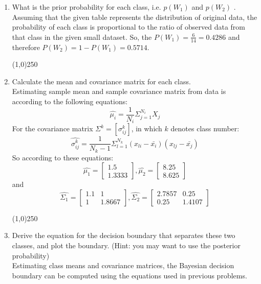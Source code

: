 \documentclass[12pt]{article}
\newcommand{\svector}[2]{\left[ \begin{matrix} #1 \\ #2 \end{matrix}\right]}
\newcommand{\smatrix}[4]{\left[ \begin{matrix} #1 & #2 \\ #3 & #4 \end{matrix}\right]}
\begin{document}
\begin{enumerate}
\item What is the prior probability for each class, i.e. $p(W_1)$ and $p(W_2 )$ . \\

Assuming that the given table represents the distribution of original data, the probability of each class is proportional to the ratio of observed data from that class in the given small dataset. So, the $P(W_1) = \frac{6}{14} = 0.4286$ and therefore $P(W_2) = 1 - P(W_1) = 0.5714$.


\begin{center}
\line(1,0){250}
\end{center}

\item Calculate the mean and covariance matrix for each class. \\
Estimating sample mean and sample covariance matrix from data is according to the following equations:
\begin{equation}
\hat{\mu_i} = \frac{1}{N_i} \Sigma_{j=1}^{N_i} X_j
\end{equation}
For the covariance matrix $\Sigma^k = [\sigma_{ij}^k]$, in which $k$ denotes class number:
\begin{equation}
\hat{\sigma_{ij}^k} = \frac{1}{N_k - 1} \Sigma_{l=1}^{N_k} (x_{li} - \bar{x_i})(x_{lj} - \bar{x_j})
\end{equation}
So according to these equations:
\begin{equation}
\hat{\mu_1} = \svector{1.5}{1.3333}, \hat{\mu_2} = \svector{8.25}{8.625}
\end{equation}
and
\begin{equation}
\hat{\Sigma_1} = \smatrix{1.1}{1}{1}{1.8667}, \hat{\Sigma_2} = \smatrix{2.7857}{0.25}{0.25}{1.4107}
\end{equation}





\begin{center}
\line(1,0){250}
\end{center}

\item Derive the equation for the decision boundary that separates these two classes, and plot the boundary. (Hint: you may want to use the posterior probability)\\
Estimating class means and covariance matrices, the Bayesian decision boundary can be computed using the equations used in previous problems. 


\end{enumerate}
\end{document}
